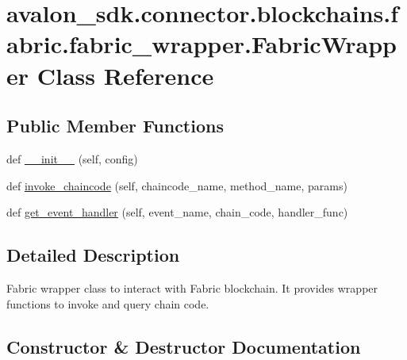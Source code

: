 \hypertarget{classavalon__sdk_1_1connector_1_1blockchains_1_1fabric_1_1fabric__wrapper_1_1FabricWrapper}{}\section{avalon\+\_\+sdk.\+connector.\+blockchains.\+fabric.\+fabric\+\_\+wrapper.\+Fabric\+Wrapper Class Reference}
\label{classavalon__sdk_1_1connector_1_1blockchains_1_1fabric_1_1fabric__wrapper_1_1FabricWrapper}
\subsection*{Public Member Functions}
\begin{DoxyCompactItemize}
\item 
def \hyperlink{classavalon__sdk_1_1connector_1_1blockchains_1_1fabric_1_1fabric__wrapper_1_1FabricWrapper_a616ad715f256cdf8474fbddf9cd10fcb}{\+\_\+\+\_\+init\+\_\+\+\_\+} (self, config)
\item 
def \hyperlink{classavalon__sdk_1_1connector_1_1blockchains_1_1fabric_1_1fabric__wrapper_1_1FabricWrapper_a41077495e7368ce960a363f95ec94428}{invoke\+\_\+chaincode} (self, chaincode\+\_\+name, method\+\_\+name, params)
\item 
def \hyperlink{classavalon__sdk_1_1connector_1_1blockchains_1_1fabric_1_1fabric__wrapper_1_1FabricWrapper_a69bdaf137351a40465f1b4ab8e506554}{get\+\_\+event\+\_\+handler} (self, event\+\_\+name, chain\+\_\+code, handler\+\_\+func)
\end{DoxyCompactItemize}


\subsection{Detailed Description}
\begin{DoxyVerb}Fabric wrapper class to interact with Fabric blockchain.
It provides wrapper functions to invoke and query chain code.
\end{DoxyVerb}
 

\subsection{Constructor \& Destructor Documentation}
\mbox{\label{classavalon__sdk_1_1connector_1_1blockchains_1_1fabric_1_1fabric__wrapper_1_1FabricWrapper_a616ad715f256cdf8474fbddf9cd10fcb}} 
